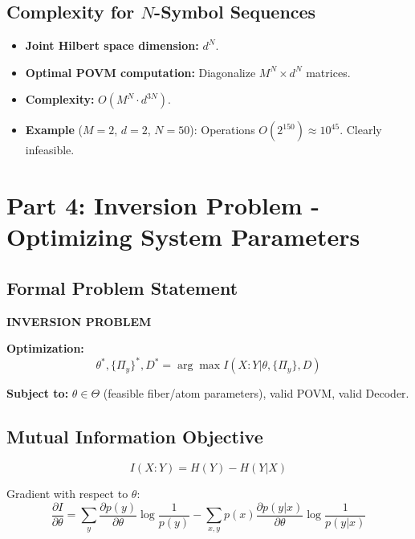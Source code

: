 \documentclass[11pt,a4paper]{article}
\begin{document}
\subsection{Complexity for $N$-Symbol Sequences}

\begin{itemize}
    \item \textbf{Joint Hilbert space dimension:} $d^N$.
    \item \textbf{Optimal POVM computation:} Diagonalize $M^N \times d^N$ matrices.
    \item \textbf{Complexity:} $O(M^N \cdot d^{3N})$.
    \item \textbf{Example} ($M = 2$, $d = 2$, $N = 50$): Operations $O(2^{150}) \approx 10^{45}$. Clearly infeasible.
\end{itemize}

\section{Part 4: Inversion Problem - Optimizing System Parameters}

\subsection{Formal Problem Statement}

\textbf{INVERSION PROBLEM}

\textbf{Optimization:}
\begin{equation}
\theta^*, \{\Pi_y\}^*, D^* = \arg\max I(X : Y|\theta, \{\Pi_y\}, D)
\end{equation}

\textbf{Subject to:} $\theta \in \Theta$ (feasible fiber/atom parameters), valid POVM, valid Decoder.

\subsection{Mutual Information Objective}

\begin{equation}
I(X : Y) = H(Y) - H(Y|X)
\end{equation}

Gradient with respect to $\theta$:
\begin{equation}
\frac{\partial I}{\partial\theta} = \sum_y \frac{\partial p(y)}{\partial\theta} \log\frac{1}{p(y)} - \sum_{x,y} p(x)\frac{\partial p(y|x)}{\partial\theta}\log\frac{1}{p(y|x)}
\end{equation}
\end{document}
